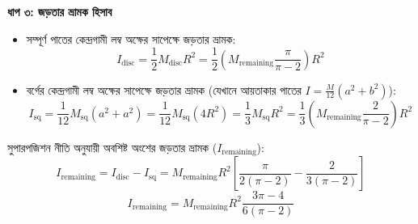 \documentclass[12pt, a4paper]{article}
\begin{document}
\begin{tcolorbox}[solutionbox={সমাধান (Solution)}]
\begin{center}
\end{center}
\vspace{1em}

\vspace{0.5em}
\noindent
\textbf{ধাপ ৩: জড়তার ভ্রামক হিসাব} \\
\begin{itemize}[leftmargin=*, parsep=0.4ex]
    \item সম্পূর্ণ পাতের কেন্দ্রগামী লম্ব অক্ষের সাপেক্ষে জড়তার ভ্রামক: 
    $$I_{\text{disc}} = \frac{1}{2} M_{\text{disc}} R^2 = \frac{1}{2} \left( M_{\text{remaining}} \frac{\pi}{\pi - 2} \right) R^2$$
    \item বর্গের কেন্দ্রগামী লম্ব অক্ষের সাপেক্ষে জড়তার ভ্রামক (যেখানে আয়তাকার পাতের $I = \frac{M}{12}(a^2+b^2)$): 
    $$I_{\text{sq}} = \frac{1}{12} M_{\text{sq}} (a^2 + a^2) = \frac{1}{12} M_{\text{sq}} (4 R^2) = \frac{1}{3} M_{\text{sq}} R^2 = \frac{1}{3} \left( M_{\text{remaining}} \frac{2}{\pi - 2} \right) R^2$$
\end{itemize}

সুপারপজিশন নীতি অনুযায়ী অবশিষ্ট অংশের জড়তার ভ্রামক ($I_{\text{remaining}}$): 
$$I_{\text{remaining}} = I_{\text{disc}} - I_{\text{sq}} = M_{\text{remaining}} R^2 \left[ \frac{\pi}{2(\pi - 2)} - \frac{2}{3(\pi - 2)} \right]$$
$$I_{\text{remaining}} = M_{\text{remaining}} R^2 \frac{3\pi - 4}{6(\pi - 2)}$$


\end{tcolorbox}
\end{document}
